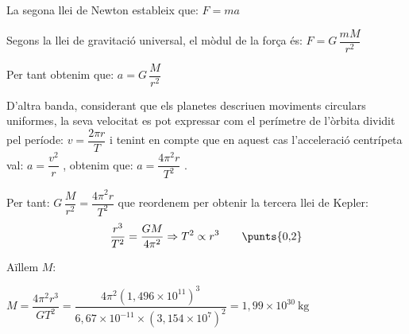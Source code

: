 \begin{solapartat}
La segona llei de Newton estableix que: $F = ma$ 

Segons la llei de gravitació universal, el mòdul de la força és: $F = G\,\dfrac{mM}{r^2}$ 

Per tant obtenim que: $a = G\,\dfrac{M}{r^2}$ 

D'altra banda, considerant que els planetes descriuen moviments circulars uniformes, la seva velocitat es pot expressar com el perímetre de l'òrbita dividit pel període: $v = \dfrac{2\pi r}{T}$  i tenint en compte que en aquest cas l'acceleració centrípeta val: $a = \dfrac{v^2}{r}$ \unskip, obtenim que: $a = \dfrac{4\pi^2 r}{T^2}$ \unskip.

Per tant: $G\,\dfrac{M}{r^2} = \dfrac{4\pi^2 r}{T^2}$ que reordenem per obtenir la tercera llei de Kepler:
\[ \frac{r^3}{T^2} = \frac{GM}{4\pi^2} \Rightarrow T^2 \propto r^3 \qquad \text{\punts{0,2}} \]
\end{solapartat}

\begin{solapartat}
Aïllem $M$:

 $M = \dfrac{4\pi^2 r^3}{GT^2} = \dfrac{4\pi^2\left(1,496\times 10^{11}\right)^3}{6,67\times 10^{-11}\times\left(3,154\times 10^{7}\right)^2} = 1,99\times 10^{30}\ \mathrm{kg}$ 
\end{solapartat}
